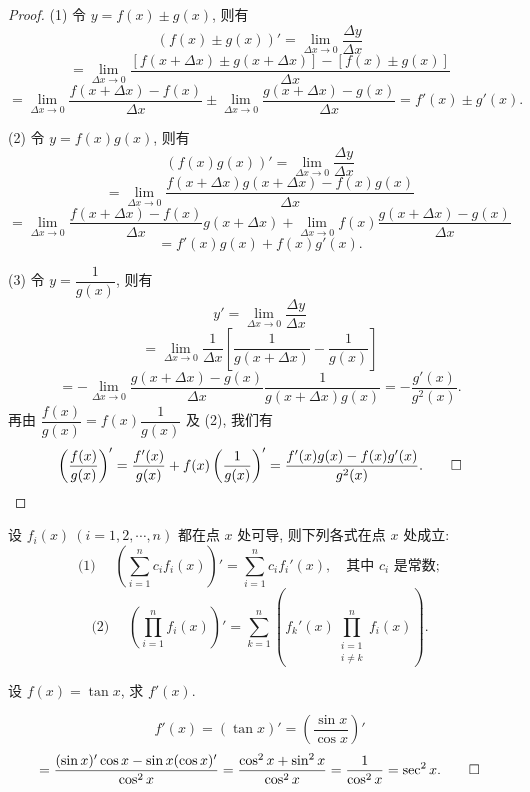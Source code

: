 \begin{proof}
(1) 令 $y=f(x)\pm g(x)$, 则有
\[
  (f(x)\pm g(x))'
  =
  \lim_{\Delta x\to0}\frac{\Delta y}{\Delta x}
\]
\[
  =
  \lim_{\Delta x\to0}
  \frac{[f(x+\Delta x)\pm g(x+\Delta x)]-[f(x)\pm g(x)]}
       {\Delta x}
\]
\[
  =
  \lim_{\Delta x\to0}\frac{f(x+\Delta x)-f(x)}{\Delta x}
  \pm
  \lim_{\Delta x\to0}\frac{g(x+\Delta x)-g(x)}{\Delta x}
  =
  f'(x)\pm g'(x).
\]

(2) 令 $y=f(x)g(x)$, 则有
\[
  (f(x)g(x))'
  =
  \lim_{\Delta x\to0}\frac{\Delta y}{\Delta x}
\]
\[
  =
  \lim_{\Delta x\to0}
  \frac{f(x+\Delta x)g(x+\Delta x)-f(x)g(x)}
       {\Delta x}
\]
\[
  =
  \lim_{\Delta x\to0}
  \frac{f(x+\Delta x)-f(x)}{\Delta x}g(x+\Delta x)
  +
  \lim_{\Delta x\to0}
  f(x)\frac{g(x+\Delta x)-g(x)}{\Delta x}
\]
\[
  =
  f'(x)g(x)+f(x)g'(x).
\]

(3) 令 $y=\dfrac1{g(x)}$, 则有
\[
  y'=
  \lim_{\Delta x\to0}\frac{\Delta y}{\Delta x}
\]
\[
  =
  \lim_{\Delta x\to0}
  \frac1{\Delta x}
  \left[
    \frac1{g(x+\Delta x)}-\frac1{g(x)}
  \right]
\]
\[
  =
  -
  \lim_{\Delta x\to0}
  \frac{g(x+\Delta x)-g(x)}{\Delta x}
  \frac1{g(x+\Delta x)g(x)}
  =
  -\frac{g'(x)}{g^2(x)}.
\]
再由 $\dfrac{f(x)}{g(x)}=f(x)\dfrac1{g(x)}$ 及 (2), 我们有
\[
  \left(\frac{f(x)}{g(x)}\right)'
  =
  \frac{f'(x)}{g(x)}
  +
  f(x)\left(\frac1{g(x)}\right)'
  =
  \frac{f'(x)g(x)-f(x)g'(x)}{g^2(x)}.
\qedhere
\]
\end{proof}


\begin{corollary}\label{corollary:ma-4-source-23}
设 $f_i(x)\ (i=1,2,\cdots,n)$ 都在点 $x$ 处可导, 则下列各式在点 $x$ 处成立:
\[
  \text{(1) }\quad
  \left(\sum_{i=1}^{n}c_if_i(x)\right)'
  =
  \sum_{i=1}^{n}c_if_i'(x),
  \quad\text{其中 }c_i\text{ 是常数};
\]
\[
  \text{(2) }\quad
  \left(\prod_{i=1}^{n}f_i(x)\right)'
  =
  \sum_{k=1}^{n}
  \left(
    f_k'(x)\prod_{\substack{i=1\\i\ne k}}^{n}f_i(x)
  \right).
\]
\end{corollary}


\begin{example}\label{example:ma-4-2-1}
设 $f(x)=\tan x$, 求 $f'(x)$.
\end{example}


\begin{solve}
\[
  f'(x)=(\tan x)'=\left(\frac{\sin x}{\cos x}\right)'
\]
\[
  =
  \frac{(\sin x)'\cos x-\sin x(\cos x)'}{\cos^2 x}
  =
  \frac{\cos^2 x+\sin^2 x}{\cos^2 x}
  =
  \frac1{\cos^2 x}
  =
  \operatorname{sec}^2x.
\qedhere
\]
\end{solve}


